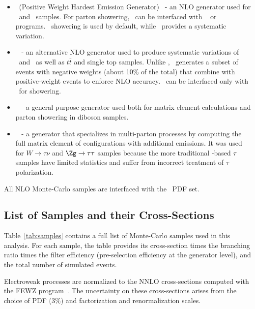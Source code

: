 \begin{itemize}
\item \Powheg~(Positive Weight Hardest Emission Generator)~\cite{Nason:2004rx,Frixione:2007vw,Alioli:2008gx,Alioli:2010xd} - an NLO generator used for \Wmn\ and \Zmm\ samples. For parton showering, \Powheg\ can be interfaced with \Pythia~\cite{pythia} or \Herwig~\cite{Corcella:2000bw} programs. \Pythia\ showering is used by default, while \Herwig\ provides a systematic variation.
\item \Mcatnlo~\cite{mcatnlo} - an alternative NLO generator used to produce systematic variations of \Wmn\ and \Zmm\, as well as $t\bar{t}$ and single top samples. Unlike \Powheg, \Mcatnlo\ generates a subset of events with negative weights (about 10\% of the total) that combine with positive-weight events to enforce NLO accuracy. \Mcatnlo\ can be interfaced only with \Herwig\ for showering.
\item \Herwig~\cite{Corcella:2000bw} - a general-purpose generator used both for matrix element calculations and parton showering in diboson samples.
\item \Alpgen~\cite{Mangano:2002ea} - a generator that specializes in multi-parton processes by computing the full matrix element of configurations with additional emissions. It was used for $W\to\tau\nu$ and $\Zg \to \tau\tau$ samples because the more traditional \Pythia-based $\tau$ samples have limited statistics and suffer from incorrect treatment of $\tau$ polarization.
\end{itemize}

All NLO Monte-Carlo samples are interfaced with the \pdfCteq\ PDF set.

\subsection{List of Samples and their Cross-Sections}

Table~\ref{tab:samples} contains a full list of Monte-Carlo samples used in this analysis. For each sample, the table provides its cross-section times the branching ratio times the filter efficiency (pre-selection efficiency at the generator level), and the total number of simulated events.

Electroweak processes are normalized to the NNLO cross-sections computed with the FEWZ program~\cite{Gavin:2010az, Gavin:2012sy, Li:2012wn}. The uncertainty on these cross-sections arises from the choice of PDF (3\%) and factorization and renormalization scales.

